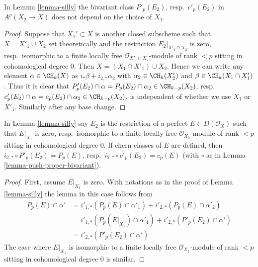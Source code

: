 \begin{lemma}
\label{lemma-silly-independent}
In Lemma \ref{lemma-silly} the bivariant class
$P'_p(E_2)$, resp.\ $c'_p(E_2)$ in $A^p(X_2 \to X)$
does not depend on the choice of $X_1$.
\end{lemma}

\begin{proof}
Suppose that $X_1' \subset X$ is another closed subscheme such that
$X = X'_1 \cup X_2$ set theoretically and the restriction
$E_2|_{X'_1 \cap X_2}$ is zero, resp.\ isomorphic to a
finite locally free $\mathcal{O}_{X'_1 \cap X_2}$-module
of rank $< p$ sitting in cohomological degree $0$.
Then $X = (X_1 \cap X'_1) \cup X_2$. Hence we can write
any element $\alpha \in \CH_k(X)$ as $i_*\beta + i_{2, *}\alpha_2$ with
$\alpha_2 \in \CH_k(X'_2)$ and $\beta \in \CH_k(X_1 \cap X'_1)$.
Thus it is clear that
$P'_p(E_2) \cap \alpha = P_p(E_2) \cap \alpha_2 \in \CH_{k - p}(X_2)$,
resp.\  $c'_p(E_2) \cap \alpha = c_p(E_2) \cap \alpha_2 \in \CH_{k - p}(X_2)$,
is independent of whether we use $X_1$ or $X'_1$. Similarly
after any base change.
\end{proof}

\begin{lemma}
\label{lemma-silly-silly}
In Lemma \ref{lemma-silly} say $E_2$ is the restriction of a
perfect $E \in D(\mathcal{O}_X)$ such that $E|_{X_1}$ is zero,
resp.\ isomorphic to a finite locally free $\mathcal{O}_{X_1}$-module
of rank $< p$ sitting in cohomological degree $0$.
If chern classes of $E$ are defined, then
$i_{2, *} \circ P'_p(E_2) = P_p(E)$,
resp.\ $i_{2, *} \circ c'_p(E_2) = c_p(E)$
(with $\circ$ as in Lemma \ref{lemma-push-proper-bivariant}).
\end{lemma}

\begin{proof}
First, assume $E|_{X_1}$ is zero.
With notations as in the proof of Lemma \ref{lemma-silly}
the lemma in this case follows from
\begin{align*}
P_p(E) \cap \alpha'
& =
i'_{1, *}(P_p(E) \cap \alpha'_1) +
i'_{2, *}(P_p(E) \cap \alpha'_2) \\
& =
i'_{1, *}(P_p(E|_{X_1}) \cap \alpha'_1) +
i'_{2, *}(P'_p(E_2) \cap \alpha') \\
& =
i'_{2, *}(P'_p(E_2) \cap \alpha')
\end{align*}
The case where $E|_{X_1}$ is isomorphic to a finite locally free
$\mathcal{O}_{X_1}$-module of rank $< p$ sitting in cohomological degree $0$
is similar.
\end{proof}

